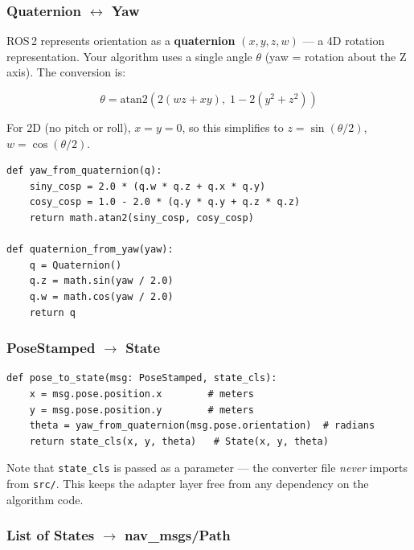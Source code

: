 \documentclass[12pt, a4paper]{article}
\begin{document}
\subsubsection{Quaternion $\leftrightarrow$ Yaw}

ROS\,2 represents orientation as a \textbf{quaternion} $(x, y, z, w)$ --- a
4D rotation representation. Your algorithm uses a single angle $\theta$
(yaw = rotation about the Z axis). The conversion is:

\begin{equation}
\theta = \text{atan2}\!\left(2(wz + xy),\; 1 - 2(y^2 + z^2)\right)
\end{equation}

For 2D (no pitch or roll), $x = y = 0$, so this simplifies to
$z = \sin(\theta/2)$, $w = \cos(\theta/2)$.

\begin{lstlisting}[style=python, caption={Quaternion conversion (converters.py)}]
def yaw_from_quaternion(q):
    siny_cosp = 2.0 * (q.w * q.z + q.x * q.y)
    cosy_cosp = 1.0 - 2.0 * (q.y * q.y + q.z * q.z)
    return math.atan2(siny_cosp, cosy_cosp)

def quaternion_from_yaw(yaw):
    q = Quaternion()
    q.z = math.sin(yaw / 2.0)
    q.w = math.cos(yaw / 2.0)
    return q
\end{lstlisting}

\subsubsection{PoseStamped $\to$ State}

\begin{lstlisting}[style=python, caption={Converting a ROS pose to algorithm State}]
def pose_to_state(msg: PoseStamped, state_cls):
    x = msg.pose.position.x        # meters
    y = msg.pose.position.y        # meters
    theta = yaw_from_quaternion(msg.pose.orientation)  # radians
    return state_cls(x, y, theta)   # State(x, y, theta)
\end{lstlisting}

Note that \texttt{state\_cls} is passed as a parameter --- the converter
file \emph{never} imports from \texttt{src/}. This keeps the adapter
layer free from any dependency on the algorithm code.

\subsubsection{List of States $\to$ nav\_msgs/Path}
\end{document}
